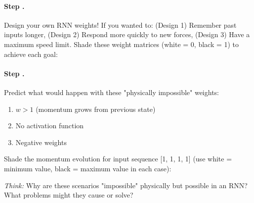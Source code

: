 \documentclass[a4paper,14pt]{extarticle}
\newcounter{exercisecount}
\newcounter{stepcount}[exercisecount]
\newcommand{\step}{\stepcounter{stepcount}\paragraph{Step \theexercisecount.\thestepcount}}
\newcommand{\think}[1]{
    \begin{mdframed}[backgroundcolor=thinkcolor,linewidth=0.5pt]
    \textit{Think:} #1
    \end{mdframed}}
\begin{document}
\step Design your own RNN weights! If you wanted to: (Design 1) Remember past inputs longer, (Design 2) Respond more quickly to new forces, (Design 3) Have a maximum speed limit. Shade these weight matrices (white = 0, black = 1) to achieve each goal:

\begin{center}
\end{center}

\step Predict what would happen with these "physically impossible" weights:
\begin{enumerate}
    \item $w > 1$ (momentum grows from previous state)
    \item No activation function
    \item Negative weights
\end{enumerate}

Shade the momentum evolution for input sequence [1, 1, 1, 1] (use white = minimum value, black = maximum value in each case):

\begin{center}
\end{center}

\think{Why are these scenarios "impossible" physically but possible in an RNN? What problems might they cause or solve?}
\end{document}
